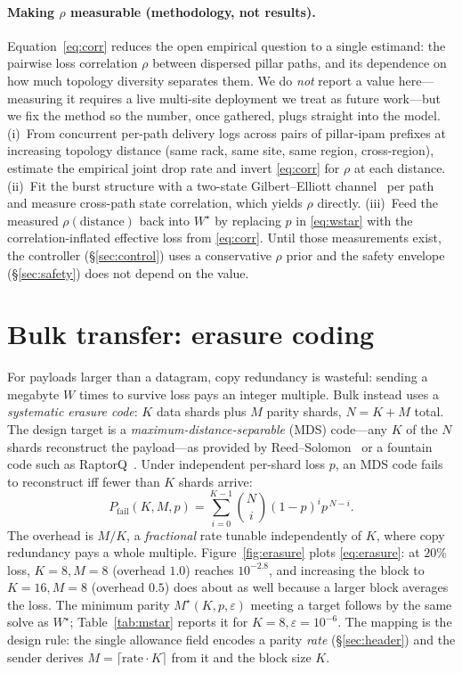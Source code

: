 \documentclass[10pt,twocolumn]{article}
\newcommand{\Wstar}{W^{\star}}
\begin{document}
\paragraph{Making $\rho$ measurable (methodology, not results).}
Equation~\eqref{eq:corr} reduces the open empirical question to a single
estimand: the pairwise loss correlation $\rho$ between dispersed pillar paths,
and its dependence on how much topology diversity separates them. We do
\emph{not} report a value here---measuring it requires a live multi-site
deployment we treat as future work---but we fix the method so the number, once
gathered, plugs straight into the model. (i)~From concurrent per-path
delivery logs across pairs of pillar-ipam prefixes at increasing topology
distance (same rack, same site, same region, cross-region), estimate the
empirical joint drop rate and invert \eqref{eq:corr} for $\rho$ at each distance.
(ii)~Fit the burst structure with a two-state Gilbert--Elliott
channel~\cite{gilbert,elliott} per path and measure cross-path state
correlation, which yields $\rho$ directly. (iii)~Feed the measured
$\rho(\text{distance})$ back into $\Wstar$ by replacing $p$ in \eqref{eq:wstar}
with the correlation-inflated effective loss from \eqref{eq:corr}. Until those
measurements exist, the controller (\S\ref{sec:control}) uses a conservative
$\rho$ prior and the safety envelope (\S\ref{sec:safety}) does not depend on the
value.

\section{Bulk transfer: erasure coding}\label{sec:erasure}
For payloads larger than a datagram, copy redundancy is wasteful: sending a
megabyte $W$ times to survive loss pays an integer multiple. Bulk instead uses a
\emph{systematic erasure code}: $K$ data shards plus $M$ parity shards, $N=K+M$
total. The design target is a \emph{maximum-distance-separable} (MDS) code---any
$K$ of the $N$ shards reconstruct the payload---as provided by
Reed--Solomon~\cite{reedsolomon} or a fountain code such as
RaptorQ~\cite{raptorq}. Under independent per-shard loss $p$, an MDS code fails
to reconstruct iff fewer than $K$ shards arrive:
\begin{equation}
  P_{\text{fail}}(K,M,p)=\sum_{i=0}^{K-1}\binom{N}{i}(1-p)^{i}p^{\,N-i}.
  \label{eq:erasure}
\end{equation}
The overhead is $M/K$, a \emph{fractional} rate tunable independently of $K$,
where copy redundancy pays a whole multiple. Figure~\ref{fig:erasure} plots
\eqref{eq:erasure}: at $20\%$ loss, $K{=}8,M{=}8$ (overhead $1.0$) reaches
$10^{-2.8}$, and increasing the block to $K{=}16,M{=}8$ (overhead $0.5$) does
about as well because a larger block averages the loss. The minimum parity
$M^\star(K,p,\varepsilon)$ meeting a target follows by the same solve as
$\Wstar$; Table~\ref{tab:mstar} reports it for $K{=}8,\varepsilon{=}10^{-6}$. The
mapping is the design rule: the single allowance field encodes a parity
\emph{rate} (\S\ref{sec:header}) and the sender derives $M=\lceil\text{rate}\cdot
K\rceil$ from it and the block size $K$.
\end{document}
